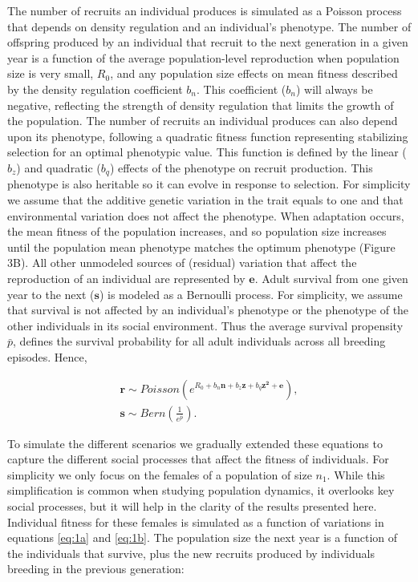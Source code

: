 \documentclass{article}
\begin{document}
The number of recruits an individual produces is simulated as a Poisson process that depends on density regulation and an individual's phenotype. The number of offspring produced by an individual that recruit to the next generation in a given year is a function of the average population-level reproduction when population size is very small, $R_0$, and any population size effects on mean fitness described by the density regulation coefficient $b_{n}$. This coefficient ($b_{n}$) will always be negative, reflecting the strength of density regulation that limits the growth of the population. The number of recruits an individual produces can also depend upon its phenotype, following a quadratic fitness function representing stabilizing selection for an optimal phenotypic value. This function is defined by the linear ($b_z$) and quadratic ($b_q$) effects of the phenotype on recruit production. This phenotype is also heritable so it can evolve in response to selection. For simplicity we assume that the additive genetic variation in the trait equals to one and that environmental variation does not affect the phenotype. When adaptation occurs, the mean fitness of the population increases, and so population size increases until the population mean phenotype matches the optimum phenotype (Figure 3B). All other unmodeled sources of (residual) variation that affect the reproduction of an individual are represented by $\mathbf{e}$. Adult survival from one given year to the next ($\mathbf{s}$) is modeled as a Bernoulli process. For simplicity, we assume that survival is not affected by an individual's phenotype or the phenotype of the other individuals in its social environment. Thus the average survival propensity $\bar{p}$, defines the survival probability for all adult individuals across all breeding episodes. Hence,

\begin{subequations} 
\begin{gather}
\mathbf{r}\sim Poisson(e^{R_{0} + b_{n} \mathbf{n} + b_{z} \mathbf{z} + b_{q} \mathbf{z^2} + \mathbf{e}}), \label{eq:1a} \\
\mathbf{s}\sim Bern(\frac{1}{e^{\bar{p}}}). \label{eq:1b}
\end{gather}
\end{subequations}

To simulate the different scenarios we gradually extended these equations to capture the different social processes that affect the fitness of individuals. For simplicity we only focus on the females of a population of size $n_{1}$. While this simplification is common when studying population dynamics, it overlooks key social processes, but it will help in the clarity of the results presented here. Individual fitness for these females is simulated as a function of variations in equations \ref{eq:1a} and \ref{eq:1b}. The population size the next year is a function of the individuals that survive, plus the new recruits produced by individuals breeding in the previous generation:
\end{document}
